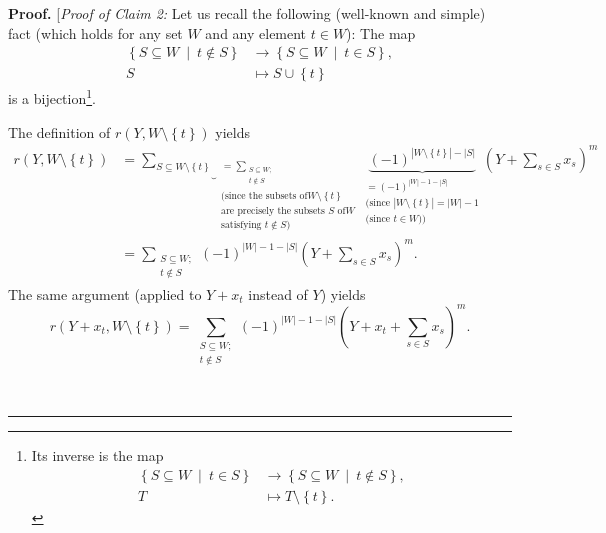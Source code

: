 \documentclass[numbers=enddot,12pt,final,onecolumn,notitlepage]{scrartcl}%
\theoremstyle{definition}
\newenvironment{proof}[1][Proof]{\noindent\textbf{#1.} }{\ \rule{0.5em}{0.5em}}
\let\sumnonlimits\sum
\renewcommand{\sum}{\sumnonlimits\limits}
\newenvironment{verlong}{}{}
\begin{document}
\begin{proof}
\begin{verlong}
[\textit{Proof of Claim 2:} Let us recall the following (well-known and
simple) fact (which holds for any set $W$ and any element $t\in W$): The map%
\begin{align}
\left\{  S\subseteq W\ \mid\ t\notin S\right\}   &  \rightarrow\left\{
S\subseteq W\ \mid\ t\in S\right\}  ,\nonumber\\
S  &  \mapsto S\cup\left\{  t\right\}  \label{pf.cor.polar2.c2.pf.bij}%
\end{align}
is a bijection\footnote{Its inverse is the map
\begin{align*}
\left\{  S\subseteq W\ \mid\ t\in S\right\}   &  \rightarrow\left\{
S\subseteq W\ \mid\ t\notin S\right\}  ,\\
T  &  \mapsto T\setminus\left\{  t\right\}  .
\end{align*}
}.

The definition of $r\left(  Y,W\setminus\left\{  t\right\}  \right)  $ yields%
\begin{align}
r\left(  Y,W\setminus\left\{  t\right\}  \right)   &  =\underbrace{\sum
_{S\subseteq W\setminus\left\{  t\right\}  }}_{\substack{=\sum
_{\substack{S\subseteq W;\\t\notin S}}\\\text{(since the subsets of
}W\setminus\left\{  t\right\}  \\\text{are precisely the subsets }S\text{ of
}W\\\text{satisfying }t\notin S\text{)}}}\underbrace{\left(  -1\right)
^{\left\vert W\setminus\left\{  t\right\}  \right\vert -\left\vert
S\right\vert }}_{\substack{=\left(  -1\right)  ^{\left\vert W\right\vert
-1-\left\vert S\right\vert }\\\text{(since }\left\vert W\setminus\left\{
t\right\}  \right\vert =\left\vert W\right\vert -1\\\text{(since }t\in
W\text{))}}}\left(  Y+\sum_{s\in S}x_{s}\right)  ^{m}\nonumber\\
&  =\sum_{\substack{S\subseteq W;\\t\notin S}}\left(  -1\right)  ^{\left\vert
W\right\vert -1-\left\vert S\right\vert }\left(  Y+\sum_{s\in S}x_{s}\right)
^{m}. \label{pf.cor.polar2.c2.pf.1}%
\end{align}
The same argument (applied to $Y+x_{t}$ instead of $Y$) yields%
\begin{equation}
r\left(  Y+x_{t},W\setminus\left\{  t\right\}  \right)  =\sum
_{\substack{S\subseteq W;\\t\notin S}}\left(  -1\right)  ^{\left\vert
W\right\vert -1-\left\vert S\right\vert }\left(  Y+x_{t}+\sum_{s\in S}%
x_{s}\right)  ^{m}. \label{pf.cor.polar2.c2.pf.2}%
\end{equation}



\end{verlong}
\end{proof}
\end{document}
